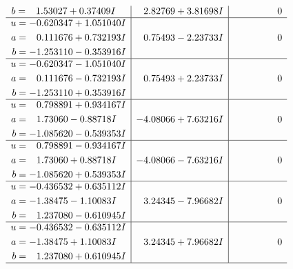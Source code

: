 \documentclass[1p]{elsarticle_modified}
\theoremstyle{definition}
\begin{document}
$$\begin{array}{c|c|c}
\begin{aligned}
b &= \phantom{-}1.53027 + 0.37409 I\end{aligned}
 & \phantom{-}2.82769 + 3.81698 I & \phantom{-0.000000 } 0 \\ \hline\begin{aligned}
u &= -0.620347 + 1.051040 I \\
a &= \phantom{-}0.111676 + 0.732193 I \\
b &= -1.253110 - 0.353916 I\end{aligned}
 & \phantom{-}0.75493 - 2.23733 I & \phantom{-0.000000 } 0 \\ \hline\begin{aligned}
u &= -0.620347 - 1.051040 I \\
a &= \phantom{-}0.111676 - 0.732193 I \\
b &= -1.253110 + 0.353916 I\end{aligned}
 & \phantom{-}0.75493 + 2.23733 I & \phantom{-0.000000 } 0 \\ \hline\begin{aligned}
u &= \phantom{-}0.798891 + 0.934167 I \\
a &= \phantom{-}1.73060 - 0.88718 I \\
b &= -1.085620 - 0.539353 I\end{aligned}
 & -4.08066 + 7.63216 I & \phantom{-0.000000 } 0 \\ \hline\begin{aligned}
u &= \phantom{-}0.798891 - 0.934167 I \\
a &= \phantom{-}1.73060 + 0.88718 I \\
b &= -1.085620 + 0.539353 I\end{aligned}
 & -4.08066 - 7.63216 I & \phantom{-0.000000 } 0 \\ \hline\begin{aligned}
u &= -0.436532 + 0.635112 I \\
a &= -1.38475 - 1.10083 I \\
b &= \phantom{-}1.237080 - 0.610945 I\end{aligned}
 & \phantom{-}3.24345 - 7.96682 I & \phantom{-0.000000 } 0 \\ \hline\begin{aligned}
u &= -0.436532 - 0.635112 I \\
a &= -1.38475 + 1.10083 I \\
b &= \phantom{-}1.237080 + 0.610945 I\end{aligned}
 & \phantom{-}3.24345 + 7.96682 I & \phantom{-0.000000 } 0\\
 \hline 
 \end{array}$$\newpage$$\begin{array}{c|c|c}  

\end{array}$$
\end{document}
